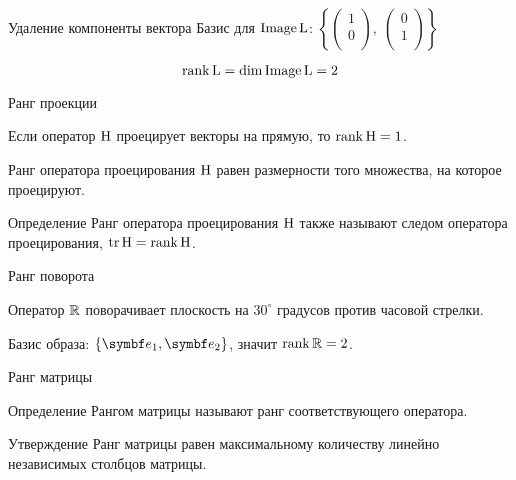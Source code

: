 \begin{frame}{Удаление компоненты вектора}
\pause 
Базис для $\operatorname{Image} \operatorname{L}$: $\left\{\begin{pmatrix}
1 \\
0 \\
\end{pmatrix}, \;
\begin{pmatrix}
0 \\
1 \\
\end{pmatrix} \right\}$

\[
\rank \operatorname{L} = \dim \operatorname{Image} \operatorname{L} = 2    
\]

\end{frame}

\begin{frame}{Ранг проекции}

Если оператор $\mathrm{H}$ проецирует векторы на прямую, то $\rank \mathrm{H} = 1$.

\pause

Ранг оператора проецирования $\mathrm{H}$ равен размерности того множества, на которое проецируют.

\pause

\begin{block}{Определение}
Ранг оператора проецирования $\mathrm{H}$ также называют \alert{следом оператора проецирования},
$\trace \HH = \rank \HH$.
\end{block}


\end{frame}


\begin{frame}{Ранг поворота}

Оператор $\mathbb{R}$ поворачивает плоскость на $30^{\circ}$ градусов против часовой стрелки.

\pause

Базис образа: $\{ \be_1, \be_2 \}$, значит $\rank \mathbb{R}  = 2$.


\end{frame}
    





\begin{frame}{Ранг матрицы}

\begin{block}{Определение}
\alert{Рангом матрицы} называют ранг соответствующего оператора.
\end{block}

\pause

\begin{block}{Утверждение}
Ранг матрицы равен максимальному количеству линейно независимых столбцов матрицы. 
\end{block}

\end{frame}




